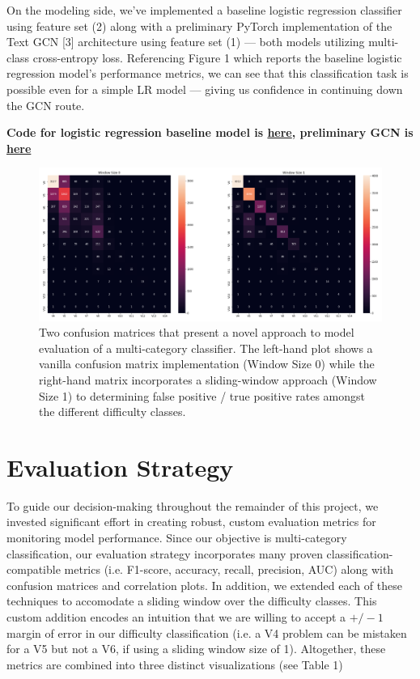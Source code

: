 \documentclass{article}
\begin{document}
On the modeling side, we've implemented a baseline logistic regression classifier using feature set (2) along with a preliminary PyTorch implementation of the Text GCN [3] architecture using feature set (1) --- both models utilizing multi-class cross-entropy loss. Referencing Figure 1 which reports the baseline logistic regression model's performance metrics, we can see that this classification task is possible even for a simple LR model --- giving us confidence in continuing down the GCN route.

{\small\textbf{Code for logistic regression baseline model is \href{https://github.com/gestalt-howard/moonGen/tree/master/howard/models_baseline}{here}, preliminary GCN is \href{https://github.com/gestalt-howard/moonGen/tree/master/aaron/v0.0/scripts}{here}}}

\begin{figure}
\centering
\includegraphics[width=.8\linewidth]{confusion_window}
\caption{Two confusion matrices that present a novel approach to model evaluation of a multi-category classifier. The left-hand plot shows a vanilla confusion matrix implementation (Window Size 0) while the right-hand matrix incorporates a sliding-window approach (Window Size 1) to determining false positive / true positive rates amongst the different difficulty classes.}
\end{figure}

\section{Evaluation Strategy}
To guide our decision-making throughout the remainder of this project, we invested significant effort in creating robust, custom evaluation metrics for monitoring model performance. Since our objective is multi-category classification, our evaluation strategy incorporates many proven classification-compatible metrics (i.e. F1-score, accuracy, recall, precision, AUC) along with confusion matrices and correlation plots. In addition, we extended each of these techniques to accomodate a sliding window over the difficulty classes. This custom addition encodes an intuition that we are willing to accept a \(+/- 1\) margin of error in our difficulty classification (i.e. a V4 problem can be mistaken for a V5 but not a V6, if using a sliding window size of 1). Altogether, these metrics are combined into three distinct visualizations (see Table 1) 
\end{document}
